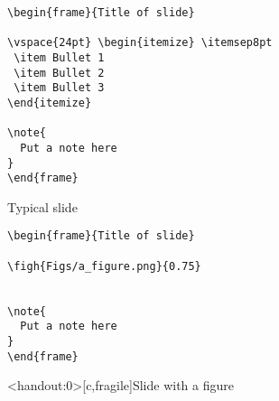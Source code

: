 \documentclass[12pt,t]{beamer}
\begin{document}
\newsavebox{\codeboxtwo}
\begin{lrbox}{\codeboxtwo}
\begin{lstlisting}
\begin{frame}{Title of slide}

\vspace{24pt} \begin{itemize} \itemsep8pt
 \item Bullet 1
 \item Bullet 2
 \item Bullet 3
\end{itemize}

\note{
  Put a note here
}
\end{frame}
\end{lstlisting}
\end{lrbox}

\begin{frame}[c,fragile]{Typical slide}
\addtocounter{framenumber}{-1}

\usebox{\codeboxtwo}

\end{frame}


\newsavebox{\codeboxthree}
\begin{lrbox}{\codeboxthree}
\begin{lstlisting}
\begin{frame}{Title of slide}

\figh{Figs/a_figure.png}{0.75}


\note{
  Put a note here
}
\end{frame}
\end{lstlisting}
\end{lrbox}


\begin{frame}<handout:0>[c,fragile]{Slide with a figure}

\usebox{\codeboxthree}

\end{frame}
\end{document}
